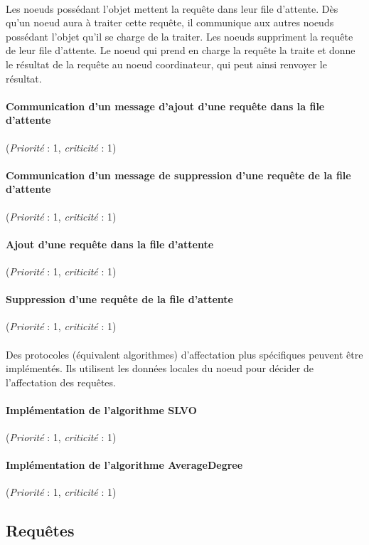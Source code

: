 \documentclass[12pt]{article}
\newcommand{\besoin}[2] {
  (\textit{Priorité} : #1, \textit{criticité} : #2)
}
\begin{document}
\paragraph{} Les noeuds possédant l'objet mettent la requête dans leur file d'attente. Dès qu'un noeud aura à traiter cette requête, il communique aux autres noeuds possédant l'objet qu'il se charge de la traiter. Les noeuds suppriment la requête de leur file d'attente. Le noeud qui prend en charge la requête la traite et donne le résultat de la requête au noeud coordinateur, qui peut ainsi renvoyer le résultat.

\paragraph{Communication d'un message d'ajout d'une requête dans la file d'attente} \besoin{1}{1}
\paragraph{Communication d'un message de suppression d'une requête de la file d'attente} \besoin{1}{1}
\paragraph{Ajout d'une requête dans la file d'attente} \besoin{1}{1}
\paragraph{Suppression d'une requête de la file d'attente} \besoin{1}{1}

\paragraph{} Des protocoles (équivalent algorithmes) d'affectation plus spécifiques peuvent être implémentés. Ils utilisent les données locales du noeud pour décider de l'affectation des requêtes.

\paragraph{Implémentation de l'algorithme \textbf{SLVO}} \besoin{1}{1}
\paragraph{Implémentation de l'algorithme \textbf{AverageDegree}} \besoin{1}{1}  

\subsection{Requêtes}
\end{document}
